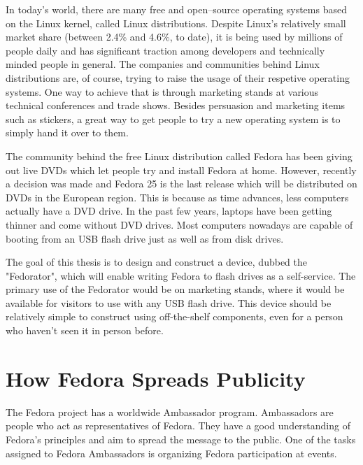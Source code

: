 \label{Introduction}
    In today's world, there are many free and open–source operating systems based on the Linux kernel, called Linux distributions\cite{whatislinux}.  Despite Linux's relatively small market share (between 2.4\% and 4.6\%, to date\cite{linuxmarketshare}), it is being used by millions of people daily and has significant traction among developers\cite{sosurvey} and technically minded people in general.  The companies and communities behind Linux distributions are, of course, trying to raise the usage of their respetive operating systems.  One way to achieve that is through marketing stands at various technical conferences and trade shows.  Besides persuasion and marketing items such as stickers, a great way to get people to try a new operating system is to simply hand it over to them.

    The community behind the free Linux distribution called Fedora\cite{fedora} has been giving out live DVDs which let people try and install Fedora at home.  However, recently a decision was made and Fedora 25 is the last release which will be distributed on DVDs in the European region.   This is because as time advances, less computers actually have a DVD drive.  In the past few years, laptops have been getting thinner and come without DVD drives\cite{laptopdvd}.  Most computers nowadays are capable of booting from an USB flash drive just as well as from disk drives\cite{fedora-how-to-live-usb}.
    
    The goal of this thesis is to design and construct a device, dubbed the "Fedorator", which will enable writing Fedora to flash drives as a self-service.  The primary use of the Fedorator would be on marketing stands, where it would be available for visitors to use with any USB flash drive.  This device should be relatively simple to construct using off-the-shelf components, even for a person who haven't seen it in person before.
    
    \section{How Fedora Spreads Publicity}
        The Fedora project has a worldwide Ambassador program.  Ambassadors are people who act as representatives of Fedora.  They have a good understanding of Fedora's principles and aim to spread the message to the public\cite{fedora-ambassadors}.  One of the tasks assigned to Fedora Ambassadors is organizing Fedora participation at events.
        
